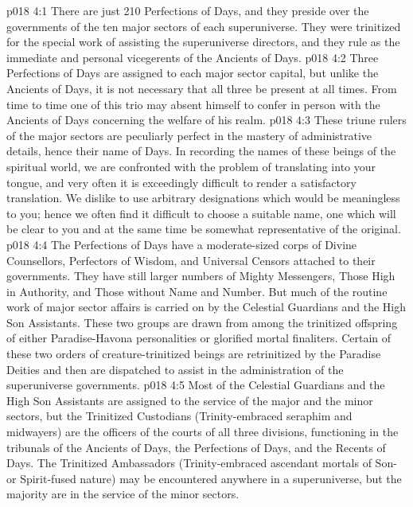 \vs p018 4:1 There are just 210 Perfections of Days, and they preside over the governments of the ten major sectors of each superuniverse. They were trinitized for the special work of assisting the superuniverse directors, and they rule as the immediate and personal vicegerents of the Ancients of Days.
\vs p018 4:2 Three Perfections of Days are assigned to each major sector capital, but unlike the Ancients of Days, it is not necessary that all three be present at all times. From time to time one of this trio may absent himself to confer in person with the Ancients of Days concerning the welfare of his realm.
\vs p018 4:3 \pc These triune rulers of the major sectors are peculiarly perfect in the mastery of administrative details, hence their name  of Days. In recording the names of these beings of the spiritual world, we are confronted with the problem of translating into your tongue, and very often it is exceedingly difficult to render a satisfactory translation. We dislike to use arbitrary designations which would be meaningless to you; hence we often find it difficult to choose a suitable name, one which will be clear to you and at the same time be somewhat representative of the original.
\vs p018 4:4 \pc The Perfections of Days have a moderate\hyp{}sized corps of Divine Counsellors, Perfectors of Wisdom, and Universal Censors attached to their governments. They have still larger numbers of Mighty Messengers, Those High in Authority, and Those without Name and Number. But much of the routine work of major sector affairs is carried on by the Celestial Guardians and the High Son Assistants. These two groups are drawn from among the trinitized offspring of either Paradise\hyp{}Havona personalities or glorified mortal finaliters. Certain of these two orders of creature\hyp{}trinitized beings are retrinitized by the Paradise Deities and then are dispatched to assist in the administration of the superuniverse governments.
\vs p018 4:5 Most of the Celestial Guardians and the High Son Assistants are assigned to the service of the major and the minor sectors, but the Trinitized Custodians (Trinity\hyp{}embraced seraphim and midwayers) are the officers of the courts of all three divisions, functioning in the tribunals of the Ancients of Days, the Perfections of Days, and the Recents of Days. The Trinitized Ambassadors (Trinity\hyp{}embraced ascendant mortals of Son\hyp{} or Spirit\hyp{}fused nature) may be encountered anywhere in a superuniverse, but the majority are in the service of the minor sectors.
